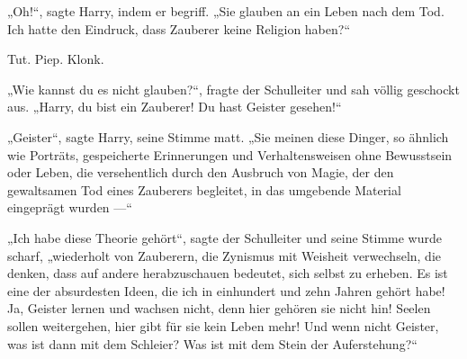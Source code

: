 „Oh!“, sagte Harry, indem er begriff.
„Sie glauben an ein Leben nach dem Tod. Ich hatte den Eindruck, dass Zauberer keine Religion haben?“

\later

Tut. Piep. Klonk.

„Wie kannst du es nicht glauben?“, fragte der Schulleiter und sah völlig geschockt aus.
„Harry, du bist ein Zauberer! Du hast Geister gesehen!“

„Geister“, sagte Harry, seine Stimme matt.
„Sie meinen diese Dinger, so ähnlich wie Porträts, gespeicherte Erinnerungen und Verhaltensweisen ohne Bewusstsein oder Leben, die versehentlich durch den Ausbruch von Magie, der den gewaltsamen Tod eines Zauberers begleitet, in das umgebende Material eingeprägt wurden —“

„Ich habe diese Theorie gehört“, sagte der Schulleiter und seine Stimme wurde scharf, „wiederholt von Zauberern, die Zynismus mit Weisheit verwechseln, die denken, dass auf andere herabzuschauen bedeutet, sich selbst zu erheben. Es ist eine der absurdesten Ideen, die ich in einhundert und zehn Jahren gehört habe! Ja, Geister lernen und wachsen nicht, denn hier gehören sie nicht hin! Seelen sollen weitergehen, hier gibt für sie kein Leben mehr! Und wenn nicht Geister, was ist dann mit dem Schleier? Was ist mit dem Stein der Auferstehung?“

